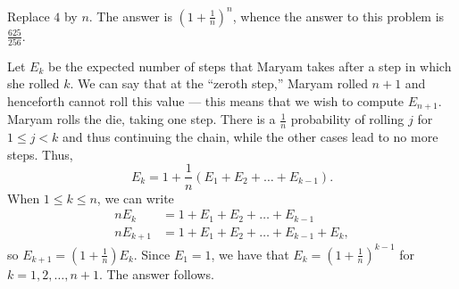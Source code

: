 Replace $4$ by $n$. The answer is $\left(1+\frac{1}{n}\right)^n$, whence the answer to this problem is $\boxed{\frac{625}{256}}$.

Let $E_k$ be the expected number of steps that Maryam takes after a step in which she rolled $k$. We can say that at the ``zeroth step,'' Maryam rolled $n+1$ and henceforth cannot roll this value --- this means that we wish to compute $E_{n+1}$. Maryam rolls the die, taking one step. There is a $\frac{1}{n}$ probability of rolling $j$ for $1\leq j<k$ and thus continuing the chain, while the other cases lead to no more steps. Thus, \[E_k=1+\frac{1}{n}\left(E_1+E_2+\ldots+E_{k-1}\right).\] When $1\leq k\leq n$, we can write
\begin{align*}
	nE_k&=1+E_1+E_2+\ldots+E_{k-1}\\
	nE_{k+1}&=1+E_1+E_2+\ldots+E_{k-1}+E_k,
\end{align*}
so $E_{k+1}=\left(1+\frac{1}{n}\right)E_k$. Since $E_1=1$, we have that $E_k=\left(1+\frac{1}{n}\right)^{k-1}$ for $k=1,2,\ldots,n+1$. The answer follows.